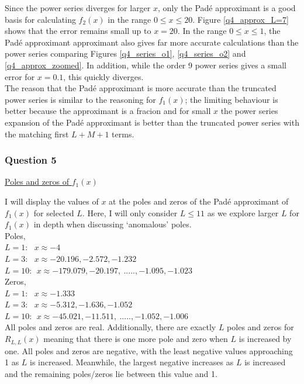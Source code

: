 \documentclass[12pt, a4paper]{article}
\begin{document}
Since the power series diverges for larger $x$, only the Pad\'e approximant is a good basis
for calculating $f_{2}(x)$ in the range $0 \leq x \leq 20$. Figure \ref{q4_approx_L=7} shows
that the error remains small up to $x=20$. In the range $0 \leq x \leq 1$, the Pad\'e approximant
approximant also gives far more accurate calculations than the power series comparing Figures
\ref{q4_series_o1}, \ref{q4_series_o2} and \ref{q4_approx_zoomed}. In addition, while the order 9
power series gives a small error for $x = 0.1$, this quickly diverges.
\\

The reason that the Pad\'e approximant is more accurate than the truncated power series is similar
to the reasoning for $f_{1}(x)$; the limiting behaviour is better because the approximant 
is a fracion and for small $x$ the power series expansion of the Pad\'e approximant is better
than the truncated power series with the matching first $L + M + 1$ terms.

\subsubsection*{Question 5}

\underline{Poles and zeros of $f_{1}(x)$}

\vspace{0.5cm}
I will display the values of $x$ at the poles and zeros of the Pad\'e approximant of $f_{1}(x)$ for 
selected $L$. Here, I will only consider $L\leq11$ as we explore larger $L$ for $f_{1}(x)$ in depth
when discussing `anomalous' poles.\\

Poles,\\
$L = 1: ~~~ x \approx -4$\\
$L = 3: ~~~ x \approx -20.196, -2.572, -1.232$\\
$L = 10: ~~ x \approx -179.079, -20.197,~....., -1.095, -1.023$\\

Zeros,\\
$L = 1: ~~~ x \approx -1.333$\\ 
$L = 3: ~~~ x \approx -5.312, -1.636, -1.052$\\
$L = 10: ~~ x \approx -45.021, -11.511,~.....,  -1.052, -1.006$
\\

All poles and zeros are real. Additionally, there are exactly $L$ poles and zeros for $R_{L,L}(x)$ meaning
that there is one more pole and zero when $L$ is increased by one. All poles and zeros are negative, with
the least negative values approaching 1 as $L$ is increased. Meanwhile, the largest negative increases as
$L$ is increased and the remaining poles/zeros lie between this value and 1.
\\
\end{document}
